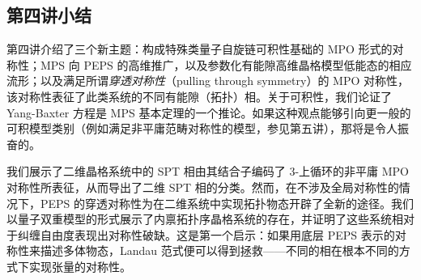 \subsection{第四讲小结} 
第四讲介绍了三个新主题：构成特殊类量子自旋链可积性基础的 MPO 形式的对称性；MPS 向 PEPS 的高维推广，以及参数化有能隙高维晶格模型低能态的相应流形；以及满足所谓\emph{穿透对称性}（pulling through symmetry）的 MPO 对称性，该对称性表征了此类系统的不同有能隙（拓扑）相。关于可积性，我们论证了 Yang-Baxter 方程是 MPS 基本定理的一个推论。如果这种观点能够引向更一般的可积模型类别（例如满足非平庸范畴对称性的模型，参见第五讲），那将是令人振奋的。

我们展示了二维晶格系统中的 SPT 相由其结合子编码了 3-上循环的非平庸 MPO 对称性所表征，从而导出了二维 SPT 相的分类。然而，在不涉及全局对称性的情况下，PEPS 的穿透对称性为在二维系统中实现拓扑物态开辟了全新的途径。我们以量子双重模型的形式展示了内禀拓扑序晶格系统的存在，并证明了这些系统相对于纠缠自由度表现出对称性破缺。这是第一个启示：如果用底层 PEPS 表示的对称性来描述多体物态，Landau 范式便可以得到拯救——不同的相在根本不同的方式下实现张量的对称性。